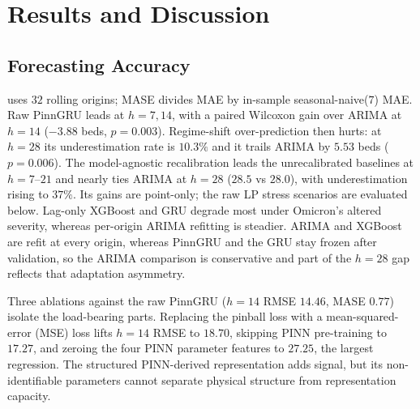 \section{Results and Discussion}\label{sec:results}

\subsection{Forecasting Accuracy}\label{ssec:e1}

 uses $32$ rolling
origins; MASE divides MAE
by in-sample seasonal-naive($7$) MAE. Raw PinnGRU leads at $h{=}7,14$,
with a paired Wilcoxon gain over ARIMA at $h{=}14$ ($-3.88$ beds,
$p{=}0.003$). Regime-shift over-prediction then hurts: at $h{=}28$ its
underestimation rate is $10.3\%$ and it trails ARIMA by $5.53$ beds
($p{=}0.006$). The model-agnostic recalibration leads the unrecalibrated
baselines at $h{=}7$--$21$ and nearly ties ARIMA at $h{=}28$
($28.5$ vs $28.0$), with underestimation rising to $37\%$. Its gains are
point-only; the raw LP stress scenarios are evaluated below. Lag-only
XGBoost and GRU degrade most under Omicron's altered severity, whereas
per-origin ARIMA refitting is steadier. ARIMA and XGBoost are refit at
every origin, whereas PinnGRU and the GRU stay frozen after validation,
so the ARIMA comparison is conservative and part of the $h{=}28$ gap
reflects that adaptation asymmetry.

Three ablations against the raw PinnGRU ($h{=}14$ RMSE $14.46$, MASE
$0.77$) isolate the load-bearing parts. Replacing the pinball loss with a
mean-squared-error (MSE) loss lifts $h{=}14$ RMSE to $18.70$, skipping
PINN pre-training to $17.27$, and zeroing the four PINN parameter
features to $27.25$, the largest regression.
The structured PINN-derived representation adds signal, but its
non-identifiable parameters cannot separate physical structure from
representation capacity.

